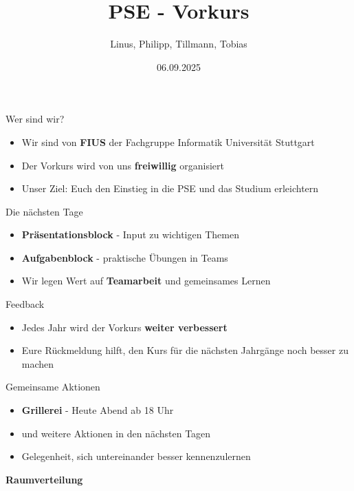 \documentclass{../../presentation}
\title{PSE - Vorkurs}
\author{Linus, Philipp, Tillmann, Tobias}
\institute{FIUS - Fachgruppe Informatik Universität Stuttgart}
\date{06.09.2025}
\begin{document}
\begin{frame}
  \titlepage
\end{frame}

\begin{frame}{Wer sind wir?}
  \begin{itemize}
    \item Wir sind von \textbf{FIUS} der Fachgruppe Informatik Universität Stuttgart
    \item Der Vorkurs wird von uns \textbf{freiwillig} organisiert
    \item Unser Ziel: Euch den Einstieg in die PSE und das Studium erleichtern
  \end{itemize}
\end{frame}

\begin{frame}{Die nächsten Tage}
  \begin{itemize}
    \item \textbf{Präsentationsblock} - Input zu wichtigen Themen
    \item \textbf{Aufgabenblock} - praktische Übungen in Teams
    \item Wir legen Wert auf \textbf{Teamarbeit} und gemeinsames Lernen
  \end{itemize}
\end{frame}

\begin{frame}{Feedback}
  \begin{itemize}
    \item Jedes Jahr wird der Vorkurs \textbf{weiter verbessert}
    \item Eure Rückmeldung hilft, den Kurs für die nächsten Jahrgänge noch besser zu machen
  \end{itemize}
\end{frame}

\begin{frame}{Gemeinsame Aktionen}
  \begin{itemize}
    \item \textbf{Grillerei} - Heute Abend ab 18 Uhr
    \item und weitere Aktionen in den nächsten Tagen
    \item Gelegenheit, sich untereinander besser kennenzulernen
  \end{itemize}
\end{frame}

\begin{frame}[plain]
  \centering
  {\Huge\bfseries{Raumverteilung}}
\end{frame}
\end{document}
